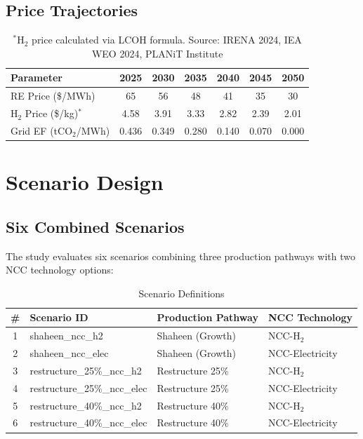 \documentclass[12pt,a4paper]{article}
\begin{document}
\subsection{Price Trajectories}

\begin{table}[H]
\centering
\caption{Energy Price Trajectories}
\begin{tabular}{lcccccc}
\toprule
Parameter & 2025 & 2030 & 2035 & 2040 & 2045 & 2050 \\
\midrule
RE Price (\$/MWh) & 65 & 56 & 48 & 41 & 35 & 30 \\
H$_2$ Price (\$/kg)$^*$ & 4.58 & 3.91 & 3.33 & 2.82 & 2.39 & 2.01 \\
Grid EF (tCO$_2$/MWh) & 0.436 & 0.349 & 0.280 & 0.140 & 0.070 & 0.000 \\
\bottomrule
\end{tabular}
\caption*{$^*$H$_2$ price calculated via LCOH formula. Source: IRENA 2024, IEA WEO 2024, PLANiT Institute}
\end{table}

\section{Scenario Design}

\subsection{Six Combined Scenarios}

The study evaluates six scenarios combining three production pathways with two NCC technology options:

\begin{table}[H]
\centering
\caption{Scenario Definitions}
\begin{tabular}{clll}
\toprule
\# & Scenario ID & Production Pathway & NCC Technology \\
\midrule
1 & shaheen\_ncc\_h2 & Shaheen (Growth) & NCC-H$_2$ \\
2 & shaheen\_ncc\_elec & Shaheen (Growth) & NCC-Electricity \\
3 & restructure\_25\%\_ncc\_h2 & Restructure 25\% & NCC-H$_2$ \\
4 & restructure\_25\%\_ncc\_elec & Restructure 25\% & NCC-Electricity \\
5 & restructure\_40\%\_ncc\_h2 & Restructure 40\% & NCC-H$_2$ \\
6 & restructure\_40\%\_ncc\_elec & Restructure 40\% & NCC-Electricity \\
\bottomrule
\end{tabular}
\end{table}
\end{document}
